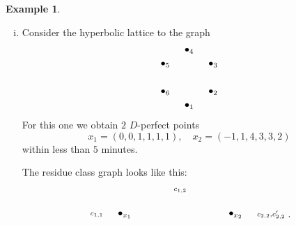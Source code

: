 \documentclass[10pt, preprint]{elsarticle}
\theoremstyle{definition}
\newtheorem{example}[theorem]{Example}
\theoremstyle{definition}
\begin{document}
\begin{example}
\begin{enumerate}[(i)]
\begin{figure}[h!]
\begin{minipage}[c]{0.5\textwidth}
                         \end{minipage}
                         \label{figComplGraphs}
                         \caption{Complete graphs with $4$ and $5$ vertices}
\end{figure}
For the corresponding hyperbolic lattice our algorithm yields in dimension $4$ ($5$) $1$ $D$-perfect point $x_1=(1,\dots ,1)$ within much less than $1$ (about $17$) seconds. For the complete graph of order $6$ the algorithm needs too much memory.
\item Consider the hyperbolic lattice to the graph
\[\xygraph{
                         !{<0cm,0cm>;<1cm,0cm>:<0cm,1cm>::}
                         !{(0,-1)}*+{\bullet_1}="1"
                         !{(0.86,-0.5)}*+{\bullet_2}="2"
                         !{(0.86,0.5)}*+{\bullet_3}="3"
                         !{(0,1)}*+{\bullet_4}="4"
                         !{(-0.86,0.5)}*+{\bullet_5}="5"
                         !{(-0.86,-0.5)}*+{\bullet_6}="6"
                         "1"-"2"
                         "1"-"3"
                         "1"-"6"
                         "1"-"5"
                         "2"-"3"
                         "2"-"4"
                         "2"-"6"
                         "3"-"4"
                         "3"-"5"
                         "4"-"5"
                         "4"-"6"
                         "5"-"6"
                         }\]
For this one we obtain $2$ $D$-perfect points
\[x_1=(0,0,1,1,1,1),\quad x_2=(-1,1,4,3,3,2)\]
within less than $5$ minutes.

The residue class graph looks like this:
\[\xygraph{
                         !{<0cm,0cm>;<2cm,0cm>:<0cm,2cm>::}
                         !{(0,0)}*+{\bullet_{x_1}}="x1"
                         !{(2,0)}*+{\bullet_{x_2}}="x2"
                         "x1"-"x2"
                         "x1"-@(ul,dl) "x1"_{c_{1,1}}
                         "x1"-@/^0.7cm/ "x2"^{c_{1,2}}
                         "x2"-@(ur,dr) "x2"^{c_{2,2},c_{2,2}'}
                         }.\]
\end{enumerate}
\end{example}
\end{document}
